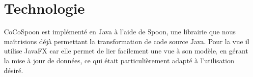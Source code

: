 \section{Technologie}
CoCoSpoon est implémenté en Java à l'aide de Spoon, une librairie que nous maîtrisions déjà permettant la transformation de code source Java. Pour la vue il utilise JavaFX car elle permet de lier facilement une vue à son modèle, en gérant la mise à jour de données, ce qui était particulièrement adapté à l'utilisation désiré. 